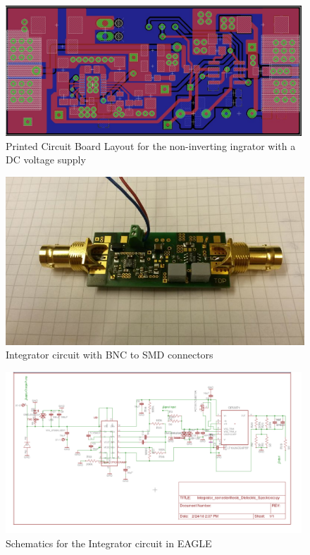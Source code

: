 \begin{figure}
\includegraphics[width=0.99\textwidth]{figures/Method/integrator/PCB_Integrator.png}
    \caption{Printed Circuit Board Layout for the non-inverting ingrator with a DC voltage supply} 
    \label{fig.solder}
\end{figure}
    
\begin{figure}[h!tb]
\includegraphics[width=\textwidth]{figures/Method/integrator/realintegrator.jpg}
\caption[Kurze Abbildungsbeschreibung]{Integrator circuit with BNC to SMD connectors}
\label{fig.realcircuit}
\end{figure}
    
    
    
\begin{figure}
\includegraphics[width=0.99\textwidth]{figures/Method/integrator/schematic.jpg}
 \caption{Schematics for the Integrator circuit in EAGLE}
 \end{figure}


